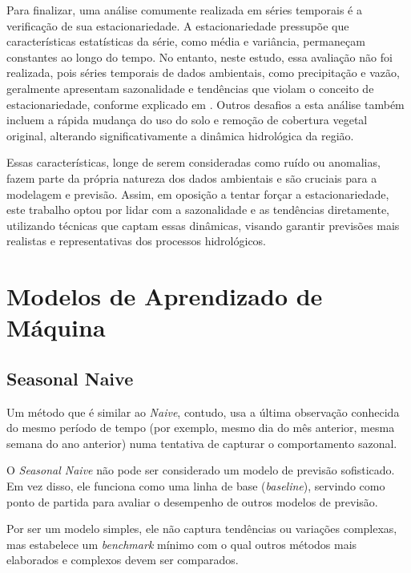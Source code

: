 Para finalizar, uma análise comumente realizada em séries temporais é a verificação de sua estacionariedade. A estacionariedade pressupõe que características estatísticas da série, como média e variância, permaneçam constantes ao longo do tempo. No entanto, neste estudo, essa avaliação não foi realizada, pois séries temporais de dados ambientais, como precipitação e vazão, geralmente apresentam sazonalidade e tendências que violam o conceito de estacionariedade, conforme explicado em \citet{hyndman_fpp3_2024e}. Outros desafios a esta análise também incluem a rápida mudança do uso do solo e remoção de cobertura vegetal original, alterando significativamente a dinâmica hidrológica da região.\cite{rayyan-33388453}

Essas características, longe de serem consideradas como ruído ou anomalias, fazem parte da própria natureza dos dados ambientais e são cruciais para a modelagem e previsão. Assim, em oposição a tentar forçar a estacionariedade, este trabalho optou por lidar com a sazonalidade e as tendências diretamente, utilizando técnicas que captam essas dinâmicas, visando garantir previsões mais realistas e representativas dos processos hidrológicos.

\section{Modelos de Aprendizado de Máquina}

\subsection{Seasonal Naive}

Um método que é similar ao \textit{Naive}, contudo, usa a última observação conhecida do mesmo período de tempo (por exemplo, mesmo dia do mês anterior, mesma semana do ano anterior) numa tentativa de capturar o comportamento sazonal.

O \textit{Seasonal Naive} não pode ser considerado um modelo de previsão sofisticado. Em vez disso, ele funciona como uma linha de base (\textit{baseline}), servindo como ponto de partida para avaliar o desempenho de outros modelos de previsão.\cite{hyndman_fpp3_2024d}

Por ser um modelo simples, ele não captura tendências ou variações complexas, mas estabelece um \textit{benchmark} mínimo com o qual outros métodos mais elaborados e complexos devem ser comparados.

